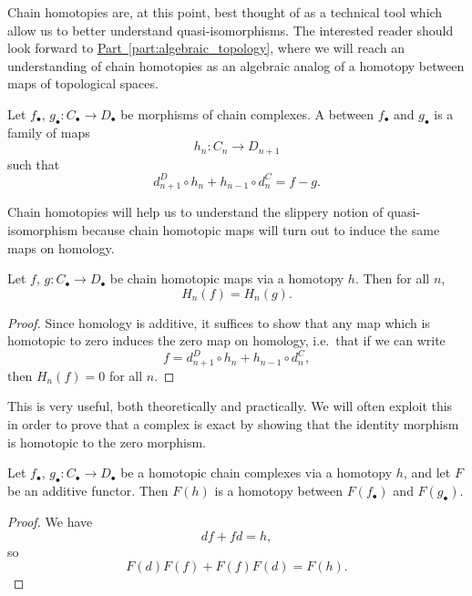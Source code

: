 \documentclass[main.tex]{subfiles}
\begin{document}
Chain homotopies are, at this point, best thought of as a technical tool which allow us to better understand quasi-isomorphisms. The interested reader should look forward to \hyperref[part:algebraic_topology]{Part~\ref*{part:algebraic_topology}}, where we will reach an understanding of chain homotopies as an algebraic analog of a homotopy between maps of topological spaces.

\begin{definition}
  \label{def:chain_homotopy}
  Let $f_{\bullet}$, $g_{\bullet}\colon C_{\bullet} \to D_{\bullet}$ be morphisms of chain complexes. A  between $f_{\bullet}$ and $g_{\bullet}$ is a family of maps
  \begin{equation*}
    h_{n}\colon C_{n} \to D_{n+1}
  \end{equation*}
  such that
  \begin{equation*}
    d^{D}_{n+1} \circ h_{n} + h_{n-1} \circ d^{C}_{n} = f - g.
  \end{equation*}
\end{definition}

Chain homotopies will help us to understand the slippery notion of quasi-isomorphism because chain homotopic maps will turn out to induce the same maps on homology.

\begin{proposition}
  \label{prop:chain_homotopic_maps_induce_same_map_on_homology}
  Let $f$, $g\colon C_{\bullet} \to D_{\bullet}$ be chain homotopic maps via a homotopy $h$. Then for all $n$,
  \begin{equation*}
    H_{n}(f) = H_{n}(g).
  \end{equation*}
\end{proposition}
\begin{proof}
  Since homology is additive, it suffices to show that any map which is homotopic to zero induces the zero map on homology, i.e.\ that if we can write
  \begin{equation*}
    f = d^{D}_{n+1} \circ h_{n} + h_{n-1} \circ d^{C}_{n},
  \end{equation*}
  then $H_{n}(f) = 0$ for all $n$.
\end{proof}

This is very useful, both theoretically and practically. We will often exploit this in order to prove that a complex is exact by showing that the identity morphism is homotopic to the zero morphism.

\begin{lemma}
  \label{lemma:additive_functors_preserve_homotopy}
  Let $f_{\bullet}$, $g_{\bullet}\colon C_{\bullet} \to D_{\bullet}$ be a homotopic chain complexes via a homotopy $h$, and let $F$ be an additive functor. Then $F(h)$ is a homotopy between $F(f_{\bullet})$ and $F(g_{\bullet})$.
\end{lemma}
\begin{proof}
  We have
  \begin{equation*}
    df + fd = h,
  \end{equation*}
  so
  \begin{equation*}
    F(d)F(f) + F(f)F(d) = F(h).
  \end{equation*}
\end{proof}
\end{document}
